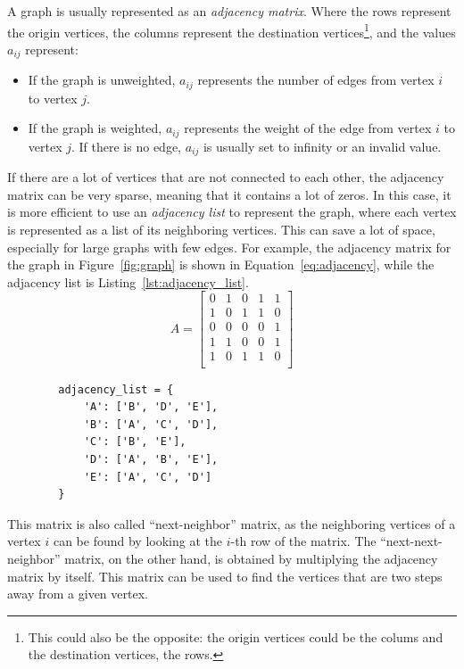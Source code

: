 A graph is usually represented as an \emph{adjacency matrix}. Where the rows represent the origin vertices, the columns represent the destination vertices\footnote{This could also be the opposite: the origin vertices could be the colums and the destination vertices, the rows.}, and the values $a_{ij}$ represent:
\begin{itemize}
    \item If the graph is unweighted, $a_{ij}$ represents the number of edges from vertex $i$ to vertex $j$.
    \item If the graph is weighted, $a_{ij}$ represents the weight of the edge from vertex $i$ to vertex $j$. If there is no edge, $a_{ij}$ is usually set to infinity or an invalid value.
\end{itemize}
If there are a lot of vertices that are not connected to each other, the adjacency matrix can be very sparse, meaning that it contains a lot of zeros. In this case, it is more efficient to use an \emph{adjacency list} to represent the graph, where each vertex is represented as a list of its neighboring vertices. This can save a lot of space, especially for large graphs with few edges. For example, the adjacency matrix for the graph in Figure~\ref{fig:graph} is shown in Equation~\ref{eq:adjacency}, while the adjacency list is Listing~\ref{lst:adjacency_list}.
\begin{equation}
    A = \begin{bmatrix}
        0 & 1 & 0 & 1 & 1 \\
        1 & 0 & 1 & 1 & 0 \\
        0 & 0 & 0 & 0 & 1 \\
        1 & 1 & 0 & 0 & 1 \\
        1 & 0 & 1 & 1 & 0 \\
    \end{bmatrix}
    \label{eq:adjacency}
\end{equation}
\begin{listing}
    \begin{verbatim}
        adjacency_list = {
            'A': ['B', 'D', 'E'],
            'B': ['A', 'C', 'D'],
            'C': ['B', 'E'],
            'D': ['A', 'B', 'E'],
            'E': ['A', 'C', 'D']
        }
    \end{verbatim}
    \caption{Adjacency list for the graph in Figure~\ref{fig:graph}.}
    \label{lst:adjacency_list}
\end{listing}

This matrix is also called ``next-neighbor'' matrix, as the neighboring vertices of a vertex $i$ can be found by looking at the $i$-th row of the matrix. The ``next-next-neighbor'' matrix, on the other hand, is obtained by multiplying the adjacency matrix by itself. This matrix can be used to find the vertices that are two steps away from a given vertex.

